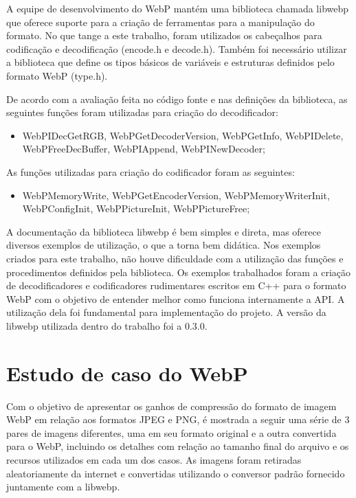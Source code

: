 \documentclass[espaco=simples,appendix=Name]{abnt}
\begin{document}
A equipe de desenvolvimento do WebP mantém uma biblioteca chamada libwebp que oferece suporte para a criação de ferramentas para a manipulação do formato. No que tange a este trabalho, foram utilizados os cabeçalhos para codificação e decodificação (encode.h e decode.h). Também foi necessário utilizar a biblioteca que define os tipos básicos de variáveis e estruturas definidos pelo formato WebP (type.h).

De acordo com a avaliação feita no código fonte e nas definições da biblioteca, as seguintes funções foram utilizadas para criação do decodificador:

\begin{itemize}
	\item WebPIDecGetRGB, WebPGetDecoderVersion, WebPGetInfo, WebPIDelete, WebPFreeDecBuffer, WebPIAppend, WebPINewDecoder;
\end{itemize}

As funções utilizadas para criação do codificador foram as seguintes:

\begin{itemize}
	\item WebPMemoryWrite, WebPGetEncoderVersion, WebPMemoryWriterInit, WebPConfigInit, WebPPictureInit, WebPPictureFree;
\end{itemize}

A documentação da biblioteca libwebp é bem simples e direta, mas oferece diversos exemplos de utilização, o que a torna bem didática. Nos exemplos criados para este trabalho, não houve dificuldade com a utilização das funções e procedimentos definidos pela biblioteca. Os exemplos trabalhados foram a criação de decodificadores e codificadores rudimentares escritos em C++ para o formato WebP com o objetivo de entender melhor como funciona internamente a API. A utilização dela foi fundamental para implementação do projeto. A versão da libwebp utilizada dentro do trabalho foi a 0.3.0.

\section{Estudo de caso do WebP}

Com o objetivo de apresentar os ganhos de compressão do formato de imagem WebP em relação aos formatos JPEG e PNG, é mostrada a seguir uma série de 3 pares de imagens diferentes, uma em seu formato original e a outra convertida para o WebP, incluindo os detalhes com relação ao tamanho final do arquivo e os recursos utilizados em cada um dos casos. As imagens foram retiradas aleatoriamente da internet e convertidas utilizando o conversor padrão fornecido juntamente com a libwebp.
\end{document}
